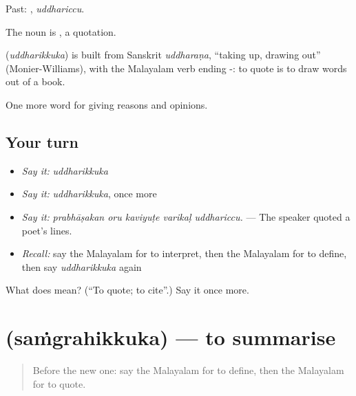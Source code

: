 Past: , \emph{uddhariccu}.

The noun is , a quotation.

\begin{cousinweb}
\textbf{} (\emph{uddharikkuka}) is built from Sanskrit \emph{uddharaṇa}, \textquotedblleft{}taking up, drawing out\textquotedblright{} (Monier-Williams), with the Malayalam verb ending -: to quote is to draw words out of a book.
\end{cousinweb}

\begin{grammarlens}[title={What you've built}]
One more word for giving reasons and opinions.
\end{grammarlens}

\subsection*{Your turn}
\begin{itemize}
\raggedright
  \item \emph{Say it:} \emph{uddharikkuka}
  \item \emph{Say it:} \emph{uddharikkuka}, once more
  \item \emph{Say it:} \emph{prabhāṣakan oru kaviyuṭe varikaḷ uddhariccu.} — The speaker quoted a poet's lines.
  \item \emph{Recall:} say the Malayalam for to interpret, then the Malayalam for to define, then say \emph{uddharikkuka} again
\end{itemize}

\begin{tcolorbox}[breakable,colback=teal!4,colframe=teal!35!black,title={Before you move on}]
What does  mean? (\textquotedblleft{}To quote; to cite\textquotedblright{}.) Say it once more.
\end{tcolorbox}
\section[\texorpdfstring{\ml{സംഗ്രഹിക്കുക} (saṁgrahikkuka)}{സംഗ്രഹിക്കുക (saṁgrahikkuka)}]{ (saṁgrahikkuka) — to summarise}

\label{lesson:ML-C439-samgrahikkuka}



\begin{quote}
Before the new one: say the Malayalam for to define, then the Malayalam for to quote.
\end{quote}

